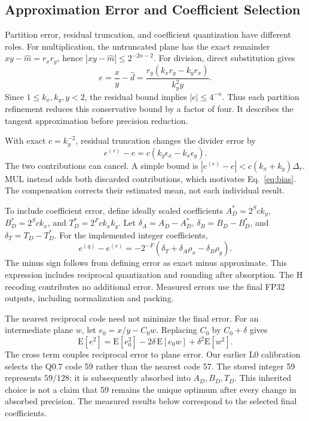 \documentclass[conference]{IEEEtran}
\begin{document}
\subsection{Approximation Error and Coefficient Selection}
Partition error, residual truncation, and coefficient quantization have
different roles. For multiplication, the untruncated plane has the exact
remainder $xy-\widehat m=r_xr_y$, hence
$|xy-\widehat m|\leq2^{-2n-2}$. For division,
direct substitution gives
\begin{equation}
e=\frac{x}{y}-\widehat d
 =\frac{r_y(k_xr_y-k_yr_x)}{k_y^2y}.
\label{eq:exacterror}
\end{equation}
Since $1\leq k_x,k_y,y<2$, the residual bound implies
$|e|\leq4^{-n}$. Thus each partition refinement reduces this conservative
bound by a factor of four. It describes the tangent approximation before
precision reduction.

With exact $c=k_y^{-2}$, residual truncation changes the divider error by
\begin{equation}
e^{(r)}-e=c(k_y\epsilon_x-k_x\epsilon_y).
\label{eq:truncerror}
\end{equation}
The two contributions can cancel. A simple bound is
$|e^{(r)}-e|<c(k_x+k_y)\Delta_r$.
MUL instead adds both discarded contributions, which motivates
Eq.~\eqref{eq:bias}. The compensation corrects their estimated mean, not
each individual result.

To include coefficient error, define ideally scaled coefficients
$A_D^*=2^Sck_y$, $B_D^*=2^Sck_x$, and
$T_D^*=2^Fck_xk_y$. Let
$\delta_A=A_D-A_D^*$, $\delta_B=B_D-B_D^*$, and
$\delta_T=T_D-T_D^*$. For the implemented integer coefficients,
\begin{equation}
e^{(q)}-e^{(r)}
=-2^{-F}(\delta_T+\delta_A\rho_x-\delta_B\rho_y).
\label{eq:coefficienterror}
\end{equation}
The minus sign follows from defining error as exact minus approximate.
This expression includes reciprocal quantization and rounding after
absorption. The H recoding contributes no additional error.
Measured errors use the final FP32 outputs, including normalization and
packing.

The nearest reciprocal code need not minimize the final error.
For an intermediate plane $w$, let $e_0=x/y-C_0w$.
Replacing $C_0$ by $C_0+\delta$ gives
\begin{equation}
\mathrm{E}[e^2]=\mathrm{E}[e_0^2]
-2\delta\,\mathrm{E}[e_0w]+\delta^2\mathrm{E}[w^2].
\label{eq:calibration}
\end{equation}
The cross term couples reciprocal error to plane error.
Our earlier L0 calibration selects the Q0.7 code 59 rather than the nearest
code 57. The stored integer 59 represents $59/128$; it is subsequently
absorbed into $A_D,B_D,T_D$. This inherited choice is not a claim that 59
remains the unique optimum after every change in absorbed precision.
The measured results below correspond to the selected final coefficients.
\end{document}
